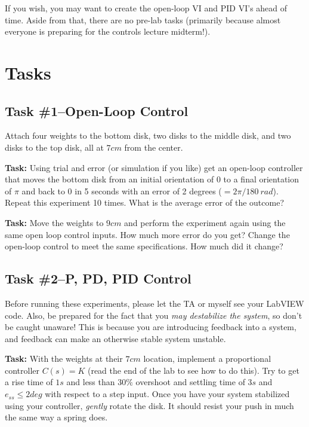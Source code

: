 If you wish, you may want to create the open-loop VI and PID VI's ahead of
time.  Aside from that, there are no pre-lab tasks (primarily because almost
everyone is preparing for the controls lecture midterm!).  

\section{Tasks}



\subsection{Task \#1--Open-Loop Control}

Attach four weights to the bottom disk, two disks to the middle disk, and two
disks to the top disk, all at $7 cm$ from the center.  

\noindent \textbf{Task:} Using trial and error (or
simulation if you like) get an open-loop controller that moves the bottom disk
from an initial orientation of $0$ to a final orientation of $\pi$ and back to 0
in 5 seconds with an error of 2 degrees ($=2\pi/180\  rad$).  Repeat this
experiment 10 times.  What is the average error of the outcome?

\noindent \textbf{Task:} Move the weights to $9 cm$ and perform the experiment
again using the same open loop control inputs.  How much more error do you get?
Change the open-loop control to meet the same specifications.  How much did it
change?


\subsection{Task \#2--P, PD, PID Control}

\noindent Before running these experiments, please let the TA or myself see your
LabVIEW code.  Also, be prepared for the fact that you \emph{may destabilize the
  system}, so don't be caught unaware!  This is because you are introducing
feedback into a system, and feedback can make an otherwise stable system
unstable.  

\noindent \textbf{Task:}  With the weights at their $7 cm$ location, implement a
proportional controller $C(s)=K$ (read the end of the lab to see how to do
this).  Try to get a rise time of $1 s$ and less than $30\%$ overshoot and
settling time of $3 s$ and $e_{ss} \leq 2 deg$ with respect to a step input.  Once
you have your system stabilized using your controller, \emph{gently} rotate the
disk.  It should resist your push in much the same way a spring does.

